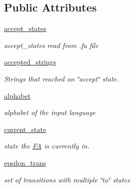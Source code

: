 \subsection*{Public Attributes}
\begin{DoxyCompactItemize}
\item 
\mbox{\label{classfinite__automaton_1_1_f_a_a97c201045f4931972aaf5e445839511f}} 
\mbox{\hyperlink{classfinite__automaton_1_1_f_a_a97c201045f4931972aaf5e445839511f}{accept\+\_\+states}}
\begin{DoxyCompactList}\small\item\em accept\+\_\+states read from .fa file \end{DoxyCompactList}\item 
\mbox{\label{classfinite__automaton_1_1_f_a_a9098e204b1b29281a1ce92393d654289}} 
\mbox{\hyperlink{classfinite__automaton_1_1_f_a_a9098e204b1b29281a1ce92393d654289}{accepted\+\_\+strings}}
\begin{DoxyCompactList}\small\item\em Strings that reached an \char`\"{}accept\char`\"{} state. \end{DoxyCompactList}\item 
\mbox{\label{classfinite__automaton_1_1_f_a_abcbc32fc68e4323620d6171a17310212}} 
\mbox{\hyperlink{classfinite__automaton_1_1_f_a_abcbc32fc68e4323620d6171a17310212}{alphabet}}
\begin{DoxyCompactList}\small\item\em alphabet of the input language \end{DoxyCompactList}\item 
\mbox{\hyperlink{classfinite__automaton_1_1_f_a_acc53c2cac20bdbeee95a9059618d7c25}{current\+\_\+state}}
\begin{DoxyCompactList}\small\item\em state the \mbox{\hyperlink{classfinite__automaton_1_1_f_a}{FA}} is currently in. \end{DoxyCompactList}\item 
\mbox{\label{classfinite__automaton_1_1_f_a_afdb4093922166fdf4211671955dc38fb}} 
\mbox{\hyperlink{classfinite__automaton_1_1_f_a_afdb4093922166fdf4211671955dc38fb}{epsilon\+\_\+trans}}
\begin{DoxyCompactList}\small\item\em set of transitions with multiple \char`\"{}to\char`\"{} states \end{DoxyCompactList}\item 

\end{DoxyCompactItemize}
